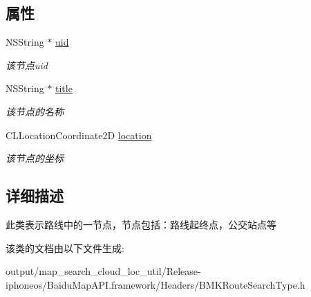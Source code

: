 \subsection*{属性}
\begin{DoxyCompactItemize}
\item 
\hypertarget{interface_b_m_k_route_node_aaa2aba77525dedcf747e2b3073d0b178}{}N\+S\+String $\ast$ \hyperlink{interface_b_m_k_route_node_aaa2aba77525dedcf747e2b3073d0b178}{uid}\label{interface_b_m_k_route_node_aaa2aba77525dedcf747e2b3073d0b178}

\begin{DoxyCompactList}\small\item\em 该节点uid \end{DoxyCompactList}\item 
\hypertarget{interface_b_m_k_route_node_a911fa36be5587e1bd9abb6bd9c4e6c2b}{}N\+S\+String $\ast$ \hyperlink{interface_b_m_k_route_node_a911fa36be5587e1bd9abb6bd9c4e6c2b}{title}\label{interface_b_m_k_route_node_a911fa36be5587e1bd9abb6bd9c4e6c2b}

\begin{DoxyCompactList}\small\item\em 该节点的名称 \end{DoxyCompactList}\item 
\hypertarget{interface_b_m_k_route_node_a4e3c2a31a2293b6f600f3b4f9a52a722}{}C\+L\+Location\+Coordinate2\+D \hyperlink{interface_b_m_k_route_node_a4e3c2a31a2293b6f600f3b4f9a52a722}{location}\label{interface_b_m_k_route_node_a4e3c2a31a2293b6f600f3b4f9a52a722}

\begin{DoxyCompactList}\small\item\em 该节点的坐标 \end{DoxyCompactList}\end{DoxyCompactItemize}


\subsection{详细描述}
此类表示路线中的一节点，节点包括：路线起终点，公交站点等 

该类的文档由以下文件生成\+:\begin{DoxyCompactItemize}
\item 
output/map\+\_\+search\+\_\+cloud\+\_\+loc\+\_\+util/\+Release-\/iphoneos/\+Baidu\+Map\+A\+P\+I.\+framework/\+Headers/B\+M\+K\+Route\+Search\+Type.\+h\end{DoxyCompactItemize}
